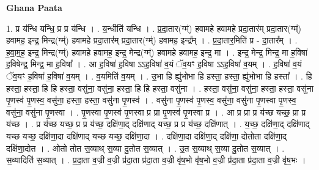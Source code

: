 \documentclass[17pt]{extarticle}
\begin{document}
\textbf{Ghana Paata } \newline

1. प्र य॑न्धि यन्धि॒ प्र प्र य॑न्धि । . य॒न्धीति॑ यन्धि । . प्र॒दा॒तार(ग्म्॑) हवामहे हवामहे प्रदा॒तार॑म् प्रदा॒तार(ग्म्॑) हवामह॒ इन्द्र॒ मिन्द्र(ग्म्॑) हवामहे प्रदा॒तार॑म् प्रदा॒तार(ग्म्॑) हवामह॒ इन्द्र᳚म् । . प्र॒दा॒तार॒मिति॑ प्र - दा॒तार᳚म् । . ह॒वा॒म॒ह॒ इन्द्र॒ मिन्द्र(ग्म्॑) हवामहे हवामह॒ इन्द्र॒ मेन्द्र(ग्म्॑) हवामहे हवामह॒ इन्द्र॒ मा । . इन्द्र॒ मेन्द्र॒ मिन्द्र॒ मा ह॒विषा॑ ह॒विषेन्द्र॒ मिन्द्र॒ मा ह॒विषा᳚ । . आ ह॒विषा॑ ह॒विषा ऽऽह॒विषा॑ व॒यं ॅव॒यꣳ ह॒विषा ऽऽह॒विषा॑ व॒यम् । . ह॒विषा॑ व॒यं ॅव॒यꣳ ह॒विषा॑ ह॒विषा॑ व॒यम् । . व॒यमिति॑ व॒यम् । . उ॒भा हि ह्यु॑भोभा हि हस्ता॒ हस्ता॒ ह्यु॑भोभा हि हस्ता᳚ । . हि हस्ता॒ हस्ता॒ हि हि हस्ता॒ वसु॑ना॒ वसु॑ना॒ हस्ता॒ हि हि हस्ता॒ वसु॑ना । . हस्ता॒ वसु॑ना॒ वसु॑ना॒ हस्ता॒ हस्ता॒ वसु॑ना पृ॒णस्व॑ पृ॒णस्व॒ वसु॑ना॒ हस्ता॒ हस्ता॒ वसु॑ना पृ॒णस्व॑ । . वसु॑ना पृ॒णस्व॑ पृ॒णस्व॒ वसु॑ना॒ वसु॑ना पृ॒णस्वा पृ॒णस्व॒ वसु॑ना॒ वसु॑ना पृ॒णस्वा । . पृ॒णस्वा पृ॒णस्व॑ पृ॒णस्वा प्र प्रा पृ॒णस्व॑ पृ॒णस्वा प्र । . आ प्र प्रा प्र य॑च्छ यच्छ॒ प्रा प्र य॑च्छ । . प्र य॑च्छ यच्छ॒ प्र प्र य॑च्छ॒ दक्षि॑णा॒द् दक्षि॑णाद् यच्छ॒ प्र प्र य॑च्छ॒ दक्षि॑णात् । . य॒च्छ॒ दक्षि॑णा॒द् दक्षि॑णाद् यच्छ यच्छ॒ दक्षि॑णा॒दा दक्षि॑णाद् यच्छ यच्छ॒ दक्षि॑णा॒दा । . दक्षि॑णा॒दा दक्षि॑णा॒द् दक्षि॑णा॒ दोतोता दक्षि॑णा॒द् दक्षि॑णा॒दोत । . ओतो तोत स॒व्याथ् स॒व्या दु॒तोत स॒व्यात् । . उ॒त स॒व्याथ् स॒व्या दु॒तोत स॒व्यात् । . स॒व्यादिति॑ स॒व्यात् । . प्र॒दा॒ता व॒ज्री व॒ज्री प्र॑दा॒ता प्र॑दा॒ता व॒ज्री वृ॑ष॒भो वृ॑ष॒भो व॒ज्री प्र॑दा॒ता प्र॑दा॒ता व॒ज्री वृ॑ष॒भः । \newline
\end{document}
